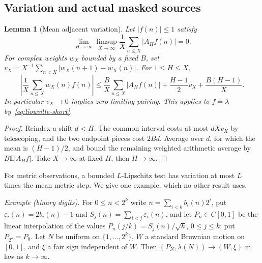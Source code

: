 \documentclass[11pt]{amsart}
\newtheorem{lemma}[theorem]{Lemma}
\theoremstyle{definition}
\theoremstyle{remark}
\newcommand{\E}{\mathbb E}
\begin{document}
\subsection{Variation and actual masked sources}
\begin{lemma}[Mean adjacent variation]\label{lem:variation-sign}
Let $|f(n)|\le1$ satisfy
\[
 \lim_{H\to\infty}\limsup_{X\to\infty}\frac1X\sum_{n\le X}|A_H f(n)|=0.
\]
For complex weights $w_X$ bounded by a fixed $B$, set $v_X=X^{-1}\sum_{n<X}|w_X(n+1)-w_X(n)|$. For $1\le H\le X$,
\[
 \left|\frac1X\sum_{n\le X}w_X(n)f(n)\right|
 \le \frac B X\sum_{n\le X}|A_H f(n)|
       +\frac{H-1}{2}v_X+\frac{B(H-1)}X.
\]
In particular $v_X\to0$ implies zero limiting pairing. This applies to $f=\lambda$ by~\eqref{eq:liouville-short}.
\end{lemma}
\begin{proof}
Reindex a shift $d<H$. The common interval costs at most $dXv_X$ by telescoping, and the two endpoint pieces cost $2Bd$. Average over $d$, for which the mean is $(H-1)/2$, and bound the remaining weighted arithmetic average by $B\E|A_Hf|$. Take $X\to\infty$ at fixed $H$, then $H\to\infty$.
\end{proof}
For metric observations, a bounded $L$-Lipschitz test has variation at most $L$ times the mean metric step. We give one example, which no other result uses.

\emph{Example (binary digits).} For $0\le n<2^k$ write $n=\sum_{i<k}b_i(n)2^i$, put $\varepsilon_i(n)=2b_i(n)-1$ and $S_j(n)=\sum_{i<j}\varepsilon_i(n)$, and let $P_n\in C[0,1]$ be the linear interpolation of the values $P_n(j/k)=S_j(n)/\sqrt k$, $0\le j\le k$; put $P_{2^k}=P_0$. Let $N$ be uniform on $\{1,\ldots,2^k\}$, $W$ a standard Brownian motion on $[0,1]$, and $\xi$ a fair sign independent of $W$. Then $(P_N,\lambda(N))\to(W,\xi)$ in law as $k\to\infty$.
\end{document}
